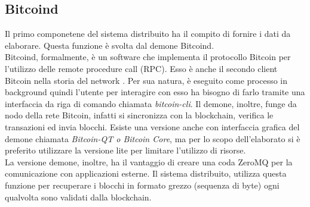 \subsection{Bitcoind}
\label{sec:bitcoind}
Il primo componetene del sistema distribuito ha il compito di fornire i dati da elaborare. Questa funzione è svolta dal demone Bitcoind.
\\Bitcoind, formalmente, è un software che implementa il protocollo Bitcoin per l'utilizzo delle remote procedure call (RPC). Esso è anche il secondo client Bitcoin nella storia del network \cite{wiki:bitcoind}. Per sua natura, è eseguito come processo in background quindi l'utente per interagire con esso ha bisogno di farlo tramite una interfaccia da riga di comando chiamata \textit{bitcoin-cli}. Il demone, inoltre, funge da nodo della rete Bitcoin, infatti si sincronizza con la blockchain, verifica le transazioni ed invia blocchi. Esiste una versione anche con interfaccia grafica del demone chiamata \textit{Bitcoin-QT o Bitcoin Core}, ma per lo scopo dell'elaborato si è preferito utilizzare la versione lite per limitare l'utilizzo di risorse.
\\La versione demone, inoltre, ha il vantaggio di creare una coda ZeroMQ per la comunicazione con applicazioni esterne. Il sistema distribuito, utilizza questa funzione per recuperare i blocchi in formato grezzo (sequenza di byte) ogni qualvolta sono validati dalla blockchain.

